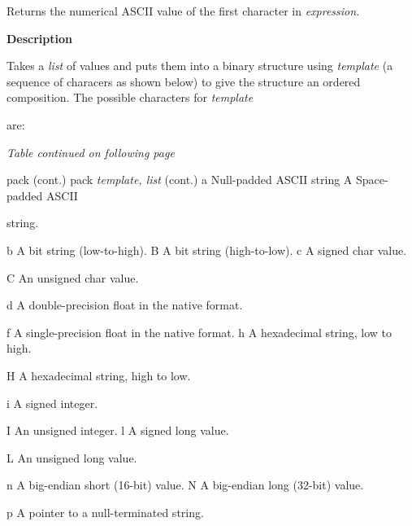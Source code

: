 \documentclass[a4paper,11pt]{book}
\begin{document}
\noindent 

\noindent Returns the numerical ASCII value of the first character in \textit{expression}.

\noindent 

\noindent 

\noindent 

\noindent 

\noindent \textbf{Description}

\noindent 

\noindent Takes a \textit{list }of values and puts them into a binary structure using \textit{template }(a sequence of characers as shown below) to give the structure an ordered composition. The possible characters for \textit{template}

\noindent are:

\noindent 

\noindent 

\noindent \textit{Table continued on following page}

\noindent 

\noindent pack (cont.) pack \textit{template, list }(cont.) a Null-padded ASCII string A Space-padded ASCII

\noindent string.

\noindent 

\noindent b A bit string (low-to-high). B A bit string (high-to-low). c A signed char value.

\noindent C An unsigned char value.

\noindent 

\noindent d A double-precision float in the native format.

\noindent 

\noindent f A single-precision float in the native format. h A hexadecimal string, low to high.

\noindent H A hexadecimal string, high to low.

\noindent 

\noindent i A signed integer.

\noindent 

\noindent I An unsigned integer. l A signed long value.

\noindent L An unsigned long value.

\noindent 

\noindent n A big-endian short (16-bit) value. N A big-endian long (32-bit) value.

\noindent p A pointer to a null-terminated string.
\end{document}
